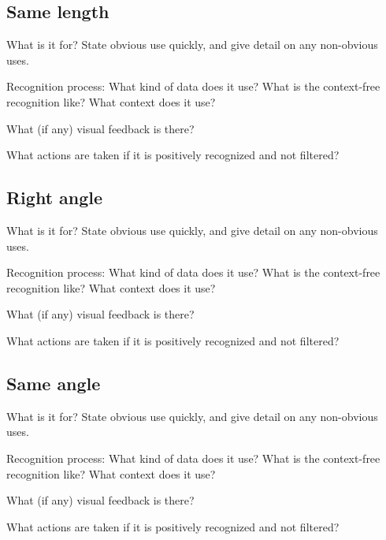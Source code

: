 \subsection{Same length}

What is it for? State obvious use quickly, and give detail on any
non-obvious uses.

Recognition process: What kind of data does it use? What is the
context-free recognition like? What context does it use?

What (if any) visual feedback is there?

What actions are taken if it is positively recognized and not
filtered?


\subsection{Right angle}

What is it for? State obvious use quickly, and give detail on any
non-obvious uses.

Recognition process: What kind of data does it use? What is the
context-free recognition like? What context does it use?

What (if any) visual feedback is there?

What actions are taken if it is positively recognized and not
filtered?

\subsection{Same angle}

What is it for? State obvious use quickly, and give detail on any
non-obvious uses.

Recognition process: What kind of data does it use? What is the
context-free recognition like? What context does it use?

What (if any) visual feedback is there?

What actions are taken if it is positively recognized and not
filtered?
